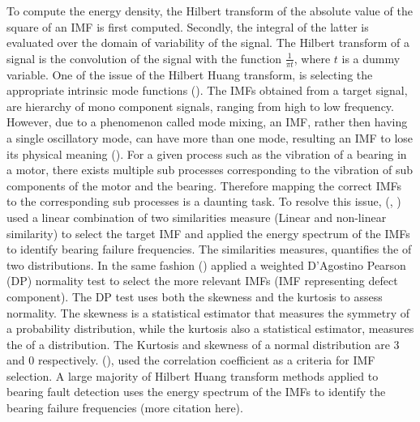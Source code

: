 \documentclass[../Main/thesis.tex]{subfiles}
\begin{document}
To compute the energy density, the Hilbert transform of the absolute value of the square of an IMF is first computed. Secondly, the integral of the latter is evaluated over the domain of variability of the signal. The Hilbert transform of a signal is the convolution of the signal with the function $\frac{1}{\pi t}$, where $t$ is a dummy variable.
\justify
One of the issue of the Hilbert Huang transform, is selecting the appropriate intrinsic mode functions (\cite{fosso2019}). The IMFs obtained from a target signal, are hierarchy of mono component signals, ranging from high to low frequency. However, due to a phenomenon called mode mixing, an IMF, rather then having a single oscillatory mode, can have more than one mode, resulting an IMF to lose its physical meaning (\cite{fosso2019}). For a given process such as the vibration of a bearing in a motor, there exists multiple sub processes corresponding to the vibration of sub components of the motor and the bearing. Therefore mapping the correct IMFs to the corresponding sub processes is a daunting task.
\justify
 To resolve this issue, (\cite{osman2013a}, \cite{osman2013b} ) used a linear combination of two similarities measure (Linear and non-linear similarity) to select the target IMF and applied the energy spectrum of the IMFs to identify bearing failure frequencies. The similarities measures, quantifies the  of two distributions.
In the same fashion (\cite{osman2014}) applied a weighted D'Agostino Pearson (DP) normality test to select the more relevant IMFs (IMF representing defect component). The DP test uses both the skewness and the kurtosis to assess normality.
The skewness is a statistical estimator that measures the symmetry of a probability distribution, while the kurtosis also a statistical estimator, measures the  of a distribution. The Kurtosis and skewness of a normal distribution are 3 and 0 respectively. (\cite{peng2004}), used the correlation coefficient as a criteria for IMF selection.
\justify
A large majority of Hilbert Huang transform methods applied to bearing fault detection uses the energy spectrum of the IMFs to identify the bearing failure frequencies (more citation here).
\justify
\end{document}
